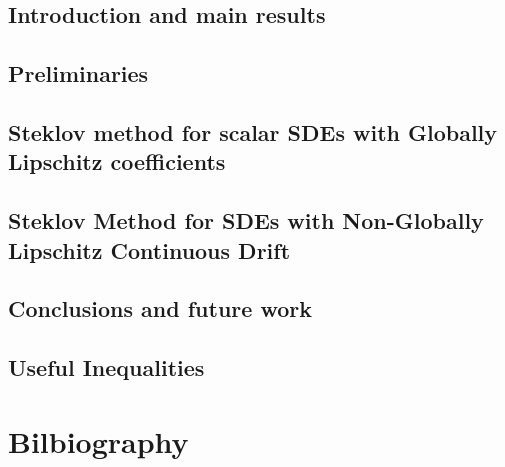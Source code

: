 
 
% 

	\frontmatter
	\pagestyle{empty} 
	
	
	
	\cleardoublepage
	\pagestyle{fancy}
	\tableofcontents
	\listoffigures
	\listoftables
	
	\cleardoublepage
	\mainmatter
	\chapter{Introduction and main results}
		\label{ch:Chapter1}
		
	\chapter{Preliminaries}
		\label{ch:Chapter2}
		
	\chapter{Steklov method for scalar SDEs with Globally Lipschitz coefficients}
		\label{ch:Chapter3}
		
	\chapter{Steklov Method for SDEs with Non-Globally Lipschitz Continuous Drift}
		\label{ch:Chapter4}
		
	\chapter{Conclusions and future work}
		\label{ch:Chapter5}
			
	\begin{appendices}
		\chapter{Useful Inequalities}
			
	\end{appendices}
	\part*{Bilbiography}
	
	
